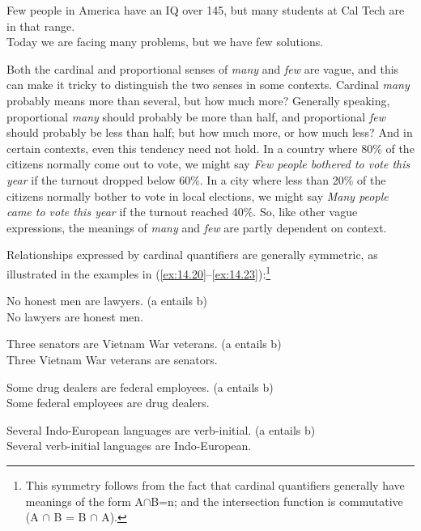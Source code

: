 \ea \label{ex:14.19}
\ea Few people in America have an IQ over 145, but many students at Cal Tech are in that range.\\
\ex Today we are facing many problems, but we have few solutions.
                       \z
\z


Both the cardinal and proportional senses of \textit{many} and \textit{few} are vague, and this can make it tricky to distinguish the two senses in some contexts. Cardinal \textit{many} probably means more than several, but how much more? Generally speaking, proportional \textit{many} should probably be more than half, and proportional \textit{few} should probably be less than half; but how much more, or how much less? And in certain contexts, even this tendency need not hold. In a country where 80\% of the citizens normally come out to vote, we might say \textit{Few people bothered to vote this year} if the turnout dropped below 60\%. In a city where less than 20\% of the citizens normally bother to vote in local elections, we might say \textit{Many people came to vote this year} if the turnout reached 40\%. So, like other vague expressions, the meanings of \textit{many} and \textit{few} are partly dependent on context.



Relationships expressed by cardinal quantifiers are generally symmetric, as illustrated in the examples in (\ref{ex:14.20}--\ref{ex:14.23}):\footnote{This symmetry follows from the fact that cardinal quantifiers generally have meanings of the form {\textbar}A${\cap}$B{\textbar}=n; and the intersection function is commutative (A ${\cap}$ B = B ${\cap}$ A).}


\ea \label{ex:14.20}
\ea No honest men are lawyers. \hfill  (a entails b)\\
\ex No lawyers are honest men.
                       \z
\z

\ea \label{ex:14.21}
\ea Three senators are Vietnam War veterans. \hfill  (a entails b)\\
\ex Three Vietnam War veterans are senators.
\z \z

\ea \label{ex:14.22}
\ea Some drug dealers are federal employees. \hfill  (a entails b)\\
\ex Some federal employees are drug dealers.
\z \z

\ea \label{ex:14.23}
\ea Several Indo-European languages are verb-initial. \hfill  (a entails b)\\
\ex Several verb-initial languages are Indo-European.
                       \z
\z


